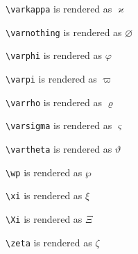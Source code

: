 \texttt{\textbackslash varkappa} is rendered as $\varkappa$


\texttt{\textbackslash varnothing} is rendered as $\varnothing$


\texttt{\textbackslash varphi} is rendered as $\varphi$


\texttt{\textbackslash varpi} is rendered as $\varpi$


\texttt{\textbackslash varrho} is rendered as $\varrho$


\texttt{\textbackslash varsigma} is rendered as $\varsigma$


\texttt{\textbackslash vartheta} is rendered as $\vartheta$


\texttt{\textbackslash wp} is rendered as $\wp$


\texttt{\textbackslash xi} is rendered as $\xi$


\texttt{\textbackslash Xi} is rendered as $\Xi$


\texttt{\textbackslash zeta} is rendered as $\zeta$

